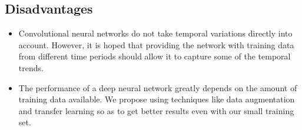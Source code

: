 \documentclass[12pt, a4paper]{report}
\begin{document}
\subsection{Disadvantages}
\begin{itemize}
\item Convolutional neural networks do not take temporal variations directly into account. However, it is hoped that providing the network with training data from different time periods should allow it to capture some of the temporal trends.
\item The performance of a deep neural network greatly depends on the amount of training data available. We propose using techniques like data augmentation and transfer learning so as to get better results even with our small training set.
\end{itemize}


\end{document}
